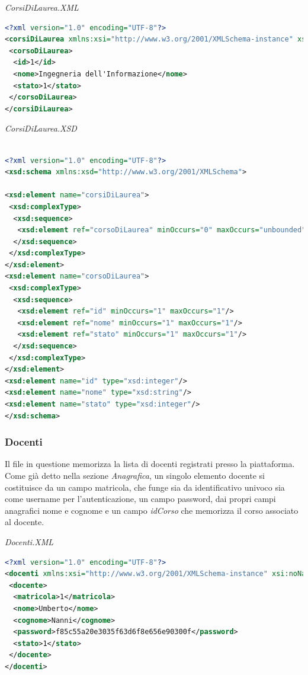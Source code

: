 \documentclass [a4paper,11pt]{book}
\begin{document}
\medskip

\emph{CorsiDiLaurea.XML}

\begin{lstlisting}[language=XML]
<?xml version="1.0" encoding="UTF-8"?>
<corsiDiLaurea xmlns:xsi="http://www.w3.org/2001/XMLSchema-instance" xsi:noNamespaceSchemaLocation="corsiDiLaurea.xsd">
 <corsoDiLaurea>
  <id>1</id>
  <nome>Ingegneria dell'Informazione</nome>
  <stato>1</stato>
 </corsoDiLaurea>
</corsiDiLaurea>
\end{lstlisting}

\medskip

\emph{CorsiDiLaurea.XSD}

\begin{lstlisting}[language=XML]

<?xml version="1.0" encoding="UTF-8"?>
<xsd:schema xmlns:xsd="http://www.w3.org/2001/XMLSchema">

<xsd:element name="corsiDiLaurea">
 <xsd:complexType>
  <xsd:sequence>
   <xsd:element ref="corsoDiLaurea" minOccurs="0" maxOccurs="unbounded" />
  </xsd:sequence>
 </xsd:complexType>
</xsd:element>
<xsd:element name="corsoDiLaurea">
 <xsd:complexType>
  <xsd:sequence>
   <xsd:element ref="id" minOccurs="1" maxOccurs="1"/>
   <xsd:element ref="nome" minOccurs="1" maxOccurs="1"/>
   <xsd:element ref="stato" minOccurs="1" maxOccurs="1"/>
  </xsd:sequence>
 </xsd:complexType>
</xsd:element>
<xsd:element name="id" type="xsd:integer"/>
<xsd:element name="nome" type="xsd:string"/>
<xsd:element name="stato" type="xsd:integer"/>
</xsd:schema>
\end{lstlisting}

\medskip

\subsubsection{Docenti}	%

Il file in questione memorizza la lista di docenti registrati presso la piattaforma. Come già detto nella sezione \emph{Anagrafica}, un singolo elemento docente si costituisce da un campo matricola, che funge sia da identificativo univoco sia come username per l'autenticazione, un campo password, dai propri campi anagrafici nome e cognome e un campo \emph{idCorso} che memorizza il corso associato al docente.

\medskip

\emph{Docenti.XML}

\begin{lstlisting}[language=XML]
<?xml version="1.0" encoding="UTF-8"?>
<docenti xmlns:xsi="http://www.w3.org/2001/XMLSchema-instance" xsi:noNamespaceSchemaLocation="docenti.xsd">
 <docente>
  <matricola>1</matricola>
  <nome>Umberto</nome>
  <cognome>Nanni</cognome>
  <password>f85c55a20e3035f63d6f8e656e90300f</password>
  <stato>1</stato>
 </docente>
</docenti>
\end{lstlisting}
\end{document}
